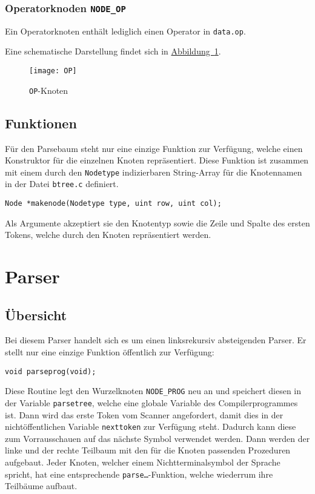 \subsubsection{Operatorknoden \texttt{NODE\_OP}}
\label{sec:opnode}
Ein Operatorknoten enthält lediglich einen Operator in \texttt{data.op}.

Eine schematische Darstellung findet sich in \hyperref[fig:opnode]{Abbildung~\ref{fig:opnode}}.

\begin{figure}[h!]
\label{fig:opnode}
\centering
\texttt{[image: OP]}
\caption{\texttt{OP}-Knoten}
\end{figure}

\subsection{Funktionen}

Für den Parsebaum steht nur eine einzige Funktion zur Verfügung,
welche einen Konstruktor für die einzelnen Knoten repräsentiert.
Diese Funktion ist zusammen mit einem durch den \texttt{Nodetype} indizierbaren String-Array für die Knotennamen in der Datei \texttt{btree.c} definiert.

\begin{lstlisting}
Node *makenode(Nodetype type, uint row, uint col);
\end{lstlisting}

Als Argumente akzeptiert sie den Knotentyp sowie die Zeile und Spalte des ersten Tokens,
welche durch den Knoten repräsentiert werden.

\clearpage

\section{Parser}

\subsection{Übersicht}
Bei diesem Parser handelt sich es um einen linksrekursiv absteigenden Parser.
Er stellt nur eine einzige Funktion öffentlich zur Verfügung:

\begin{lstlisting}
void parseprog(void);
\end{lstlisting}

Diese Routine legt den Wurzelknoten \texttt{NODE\_PROG} neu an und speichert diesen in der Variable \texttt{parsetree},
welche eine globale Variable des Compilerprogrammes ist.
Dann wird das erste Token vom Scanner angefordert,
damit dies in der nichtöffentlichen Variable \texttt{nexttoken} zur Verfügung steht.
Dadurch kann diese zum Vorrausschauen auf das nächste Symbol verwendet werden.
Dann werden der linke und der rechte Teilbaum mit den für die Knoten passenden Prozeduren aufgebaut.
Jeder Knoten, welcher einem Nichtterminalsymbol der Sprache spricht,
hat eine entsprechende \texttt{parse\ldots}-Funktion,
welche wiederrum ihre Teilbäume aufbaut.

